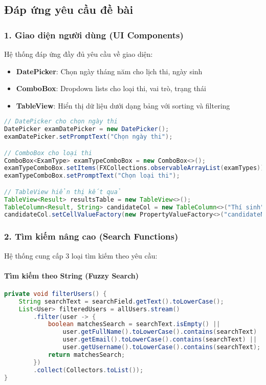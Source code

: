 \documentclass[12pt,a4paper]{article}
\begin{document}
\subsection{Đáp ứng yêu cầu đề bài}

\subsubsection{1. Giao diện người dùng (UI Components)}

Hệ thống đáp ứng đầy đủ yêu cầu về giao diện:

\begin{itemize}
    \item \textbf{DatePicker}: Chọn ngày tháng năm cho lịch thi, ngày sinh
    \item \textbf{ComboBox}: Dropdown lists cho loại thi, vai trò, trạng thái
    \item \textbf{TableView}: Hiển thị dữ liệu dưới dạng bảng với sorting và filtering
\end{itemize}

\begin{lstlisting}[language=Java, caption=Ví dụ sử dụng DatePicker và ComboBox]
// DatePicker cho chọn ngày thi
DatePicker examDatePicker = new DatePicker();
examDatePicker.setPromptText("Chọn ngày thi");

// ComboBox cho loại thi
ComboBox<ExamType> examTypeComboBox = new ComboBox<>();
examTypeComboBox.setItems(FXCollections.observableArrayList(examTypes));
examTypeComboBox.setPromptText("Chọn loại thi");

// TableView hiển thị kết quả
TableView<Result> resultsTable = new TableView<>();
TableColumn<Result, String> candidateCol = new TableColumn<>("Thí sinh");
candidateCol.setCellValueFactory(new PropertyValueFactory<>("candidateName"));
\end{lstlisting}

\subsubsection{2. Tìm kiếm nâng cao (Search Functions)}

Hệ thống cung cấp 3 loại tìm kiếm theo yêu cầu:

\paragraph{Tìm kiếm theo String (Fuzzy Search)}
\begin{lstlisting}[language=Java, caption=Tìm kiếm gần đúng theo tên]
private void filterUsers() {
    String searchText = searchField.getText().toLowerCase();
    List<User> filteredUsers = allUsers.stream()
        .filter(user -> {
            boolean matchesSearch = searchText.isEmpty() ||
                user.getFullName().toLowerCase().contains(searchText) ||
                user.getEmail().toLowerCase().contains(searchText) ||
                user.getUsername().toLowerCase().contains(searchText);
            return matchesSearch;
        })
        .collect(Collectors.toList());
}
\end{lstlisting}
\end{document}
